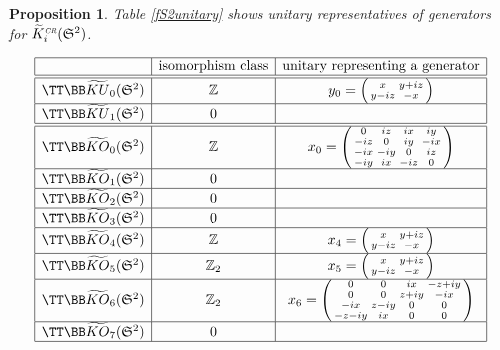 \documentclass[12pt, reqno]{amsart}
\newtheorem{prop}[thm]{Proposition}
\theoremstyle{definition}
\def\Z{{\mathbb Z}}
\def\crr{^{\scriptscriptstyle {\it CR}}}
\newcommand{\fS}{\mathfrak S}
\newcommand{\sm}[4]
	{ \left( \begin{smallmatrix} {#1} & {#2} \\ {#3} & {#4} \end{smallmatrix} \right)  }
\begin{document}
\vspace{.5cm}

\begin{prop}
Table \ref{fS2unitary} shows unitary representatives of generators for $\widetilde{K}\crr_i(\fS^2)$.
\end{prop}

\begin{table} 
\caption{Unitaries for $K\crr(\fS^2)$} \label{fS2unitary}
$$\begin{array}{|c|c|c|}  \hline
  & \text{isomorphism class} & { \text{unitary representing a generator}}  \\ \hline \hline
\TT \BB \widetilde{KU}_0( \fS^2)  & \Z &  y_0 = \sm{x}{y + iz}{y - iz}{-x}  \\ \hline
\TT \BB \widetilde{KU}_1(\fS^2) & 0 &     \\ \hline \hline
\TT \BB \widetilde{KO}_{0}(\fS^2)  & \Z & 
	x_0 =  \left(  \begin{smallmatrix}  0 & iz & ix & iy \\ -iz &  0 & iy & -ix \\ -ix & -iy & 0 & iz \\ -iy & ix & -iz & 0 
						\end{smallmatrix} \right) 
					\\ \hline 
\TT \BB \widetilde{KO}_1(\fS^2)  & 0 &   \\ \hline 
\TT \BB \widetilde{KO}_2(\fS^2)  & 0 &    \\ \hline
\TT \BB\widetilde{KO}_3(\fS^2)  & 0 &  \\ \hline 
\TT \BB \widetilde{KO}_4(\fS^2)  & \Z & x_4 = 
		\left( \begin{smallmatrix} x & y + iz   \\ y - iz & -x  \end{smallmatrix} \right) \\  \hline
\TT \BB \widetilde{KO}_5(\fS^2) & \Z_2 & x_5 =
	\left( \begin{smallmatrix} x & y + iz   \\ y - iz & -x  \end{smallmatrix} \right) \\  \hline
\TT \BB \widetilde{KO}_6(\fS^2) & \Z_2 & 
	x_6 =  \left( \begin{smallmatrix} 0 & 0 & ix & -z + iy \\ 0 & 0 & z + iy & -ix
			\\ -ix & z - iy & 0 & 0 \\  -z - iy & ix & 0 & 0
				\end{smallmatrix} \right)	 \\ \hline 
\TT \BB \widetilde{KO}_7(\fS^2)   & 0 &  \\ \hline 
\end{array}$$
\end{table}
\end{document}
